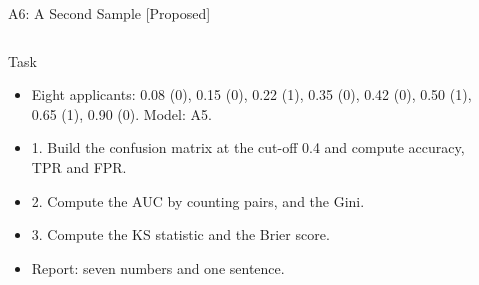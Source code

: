 \begin{frame}{A6: A Second Sample [Proposed]}
\propsub
\itemsize{\scriptsize}
\begin{columns}[T]
\begin{column}{\taskw}
\begin{block}{Task}
\begin{itemize}
    \item Eight applicants: 0.08 (0), 0.15 (0), 0.22 (1), 0.35 (0), 0.42 (0), 0.50 (1), 0.65 (1), 0.90 (0). Model: A5.
    \item 1. Build the confusion matrix at the cut-off 0.4 and compute accuracy, TPR and FPR.
    \item 2. Compute the AUC by counting pairs, and the Gini.
    \item 3. Compute the KS statistic and the Brier score.
    \item Report: seven numbers and one sentence.
\end{itemize}
\end{block}
\end{column}
\begin{column}{\solw}
\end{column}
\end{columns}
\end{frame}

